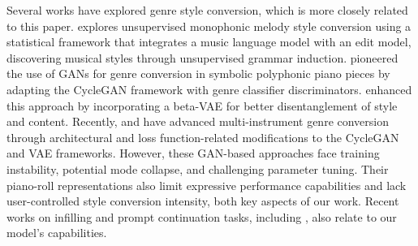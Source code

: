Several works have explored genre style conversion, which is more closely related to this paper. \cite{nakamura2019unsupervised} explores unsupervised monophonic melody style conversion using a statistical framework that integrates a music language model with an edit model, discovering musical styles through unsupervised grammar induction. \cite{brunner2018symbolic} pioneered the use of GANs for genre conversion in symbolic polyphonic piano pieces by adapting the CycleGAN \cite{zhu2017unpaired} framework with genre classifier discriminators. \cite{fu2020transfer} enhanced this approach by incorporating a beta-VAE \cite{higgins2017beta} for better disentanglement of style and content. Recently, \cite{sulaiman2022genre} and \cite{ding2022steelygan} have advanced multi-instrument genre conversion through architectural and loss function-related modifications to the CycleGAN and VAE frameworks. However, these GAN-based approaches face training instability, potential mode collapse, and challenging parameter tuning. Their piano-roll representations also limit expressive performance capabilities and lack user-controlled style conversion intensity, both key aspects of our work. Recent works on infilling and prompt continuation tasks, including \cite{min2023polyffusion,lv2023getmusic,thickstun2023anticipatory,chang2021variable,hadjeres2021piano}, also relate to our model's capabilities.